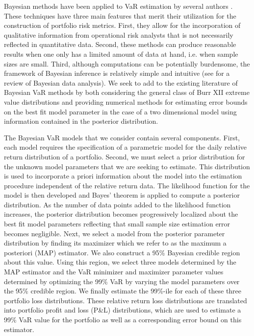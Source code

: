 \documentclass{amsart}
\begin{document}
Bayesian methods have been applied to VaR estimation by several authors 
\cite{Ausin-14,Hoogerheide-08, Pollard-07,Siu-04}.
These techniques have three main features that merit
their utilization for the construction of portfolio risk metrics.  
First, they allow for the incorporation of qualitative 
information from operational risk analysts that is not necessarily reflected 
in quantitative data.
Second, these methods can produce reasonable results when one only has a 
limited amount of data at hand, i.e. when sample sizes are small.  Third, 
although computations can be potentially burdensome, the framework of Bayesian 
inference is relatively simple and intuitive (see \cite{Gelman-03} for a review of 
Bayesian data analysis).  We seek to add to the existing literature of Bayesian 
VaR methods by both considering the general class of Burr XII extreme value
distributions and providing numerical methods for estimating error bounds on the 
best fit model parameter in the case of a two dimensional model using information 
contained in the posterior distribution.

The Bayesian VaR models that we consider contain several components.  First, 
each model requires the specification of a parametric model for the daily 
relative return distribution of a portfolio.
Second, we must select a prior distribution for the unknown model parameters that we are 
seeking to estimate.  This distribution is used 
to incorporate a priori information about the model into the estimation procedure independent 
of the relative return data.  The likelihood function for the model is then 
developed and Bayes' theorem is applied to compute a 
posterior distribution.  As the number of data points added to the  
likelihood function increases, the posterior 
distribution becomes progressively localized about the best fit model parameters 
reflecting that small sample size estimation error
becomes negligible. Next, we select a model from the posterior parameter distribution by 
finding its maximizer which we refer to as the 
maximum a posteriori (MAP) estimator.
We also construct a 95\% Bayesian credible region about this value.  Using this region, we 
select three models 
determined by the MAP estimator and the VaR minimizer and maximizer parameter values
determined by optimizing the 99\% VaR by varying the model parameters over the 
95\% credible region. 
We finally estimate the 99\%-ile for each of these three portfolio loss distributions.
These relative return loss distributions are translated into portfolio profit and 
loss (P\&L) distributions, which are used to estimate a 99\% VaR value for the portfolio 
as well as a corresponding error bound on this estimator.
\end{document}
